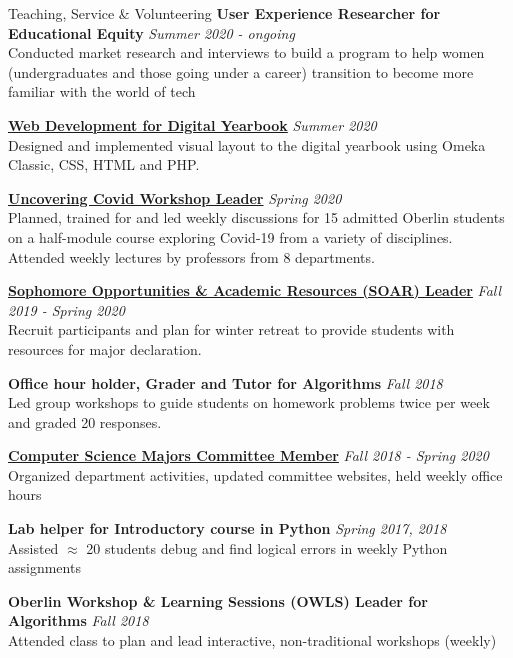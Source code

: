 \documentclass{resume}
\begin{document}
\begin{rSection}{Teaching, Service \& Volunteering} 
{\bf User Experience Researcher for Educational Equity} \hfill{\em Summer 2020 - ongoing} \\
Conducted market research and interviews to build a program to help women (undergraduates and those going under a career) transition to become more familiar with the world of tech 

{\bf \href{https://www.oc2020.oberlincollegelibrary.org/}{Web Development for Digital Yearbook}} \hfill{\em Summer 2020} \\
Designed and implemented visual layout to the digital yearbook using Omeka Classic, CSS, HTML and PHP.

{\bf \href{https://www.oberlin.edu/admissions-and-aid/for-accepted-students/virtual-visits/covid-19-course}{Uncovering Covid Workshop Leader}} \hfill{\em Spring 2020} \\
Planned, trained for and led weekly discussions for 15 admitted Oberlin students on a half-module course exploring Covid-19 from a variety of disciplines. Attended weekly lectures by professors from 8 departments.

{\bf \href{https://www.oberlin.edu/career/set/soar/soar-leaders}{Sophomore Opportunities \& Academic Resources (SOAR) Leader}} \hfill{\em Fall 2019 - Spring 2020} \\
Recruit participants and plan for winter retreat to provide students with resources for major declaration.

{\bf Office hour holder, Grader and Tutor for Algorithms} \hfill {\em Fall 2018} \\
{ Led group workshops to guide students on homework problems twice per week and graded 20 responses.} 

\href{http://www.cs.oberlin.edu/~csmc/officers.php}{\textbf{Computer Science Majors Committee Member}} \hfill {\em Fall 2018 - Spring 2020} \\
{ Organized department activities, updated committee websites, held weekly office hours} 

{\bf Lab helper for Introductory course in Python} \hfill {\em Spring 2017, 2018} \\
{ Assisted $\approx$ 20 students debug and find logical errors in weekly Python assignments}

{\bf Oberlin Workshop \& Learning Sessions (OWLS) Leader for Algorithms} \hfill {\em Fall 2018} \\
{ Attended class to plan and lead interactive, non-traditional workshops (weekly)} 


\end{rSection}
\end{document}

